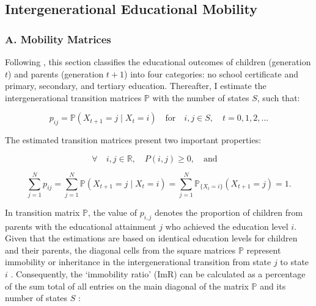 \documentclass[a4paper, 12pt]{article}
\begin{document}
\subsection{Intergenerational Educational Mobility}

\subsubsection*{A. Mobility Matrices}

Following \citet{Daouli&Demoussis&Giannakopoulos2010}, this section classifies the educational outcomes of children (generation $t$) and parents (generation $t+1$) into four categories: no school certificate and primary, secondary, and tertiary education. Thereafter, I estimate the intergenerational transition matrices $\mathbb{P}$ with the number of states $S$, such that:


\begin{equation} \label{eq:Notation}
p_{ij} = \mathbb{P} (X_{t+1} = j \mid X_t = i) \quad \textrm{for} \quad i, j \in S, \quad t = 0,1,2,...
\end{equation}

The estimated transition matrices present two important properties:

\begin{equation} \label{eq:NonNegativ}
\forall \quad i,j \in \mathbb{R}, \quad P(i,j) \geq 0, \quad \textrm{and} \quad
\end{equation}

\begin{equation} \label{eq:EqualOne}
\sum_{j=1}^{N} p_{ij} = \sum_{j=1}^{N} \mathbb{P} (X_{t+1} = j \mid X_t = i) =  \sum_{j=1}^{N} \mathbb{P}_{\{X_t = i\}} (X_{t+1} = j) = 1.
\end{equation}

In transition matrix $\mathbb{P}$, the value of $p_{i,j}$ denotes the proportion of children from parents with the educational attainment $j$ who achieved the education level $i$. Given that the estimations are based on identical education levels for children and their parents, the diagonal cells from the square matrices $\mathbb{P}$ represent immobility or inheritance in the intergenerational transition from state $j$ to state $i$ \citep{xie2013intergenerational, reddy2015changes}. Consequently, the ‘immobility ratio’ (ImR) can be calculated as a percentage of the sum total of all entries on the main diagonal of the matrix $\mathbb{P}$ and its number of states $S$ \citep{Heineck&Riphahn2007}:
\end{document}
